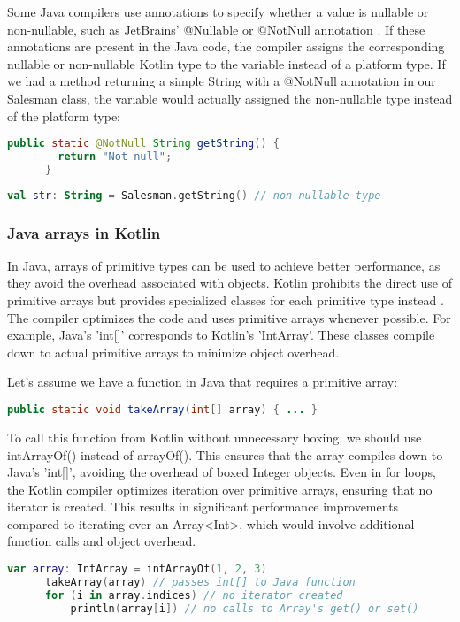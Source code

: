 \documentclass[a4paper, 11pt]{article}
\begin{document}
    Some Java compilers use annotations \cite{interop-nullability-annotations} to specify whether a value is nullable or non-nullable, such as JetBrains' @Nullable or @NotNull annotation \cite{JetBrains-annotations}. If these annotations are present in the Java code, the compiler assigns the corresponding nullable or non-nullable Kotlin type to the variable instead of a platform type. If we had a method returning a simple String with a @NotNull annotation in our Salesman class, the variable would actually assigned the non-nullable type instead of the platform type:
    \begin{lstlisting}[language=Java]
      public static @NotNull String getString() {
        return "Not null";
      }
    \end{lstlisting}
    \begin{lstlisting}[language=Kotlin]
      val str: String = Salesman.getString() // non-nullable type
    \end{lstlisting}

  \subsubsection{Java arrays in Kotlin}
    In Java, arrays of primitive types can be used to achieve better performance, as they avoid the overhead associated with objects. Kotlin prohibits the direct use of primitive arrays but provides specialized classes for each primitive type instead \cite{interop-arrays}. The compiler optimizes the code and uses primitive arrays whenever possible. For example, Java's 'int[]' corresponds to Kotlin's 'IntArray'. These classes compile down to actual primitive arrays to minimize object overhead.

    Let's assume we have a function in Java that requires a primitive array:
    \begin{lstlisting}[language=Java]
      public static void takeArray(int[] array) { ... }
    \end{lstlisting}
    To call this function from Kotlin without unnecessary boxing, we should use intArrayOf() instead of arrayOf(). This ensures that the array compiles down to Java's 'int[]', avoiding the overhead of boxed Integer objects. Even in for loops, the Kotlin compiler optimizes iteration over primitive arrays, ensuring that no iterator is created. This results in significant performance improvements compared to iterating over an Array<Int>, which would involve additional function calls and object overhead.
    \begin{lstlisting}[language=Kotlin]
      var array: IntArray = intArrayOf(1, 2, 3)
      takeArray(array) // passes int[] to Java function
      for (i in array.indices) // no iterator created
          println(array[i]) // no calls to Array's get() or set()
    \end{lstlisting}
\end{document}
